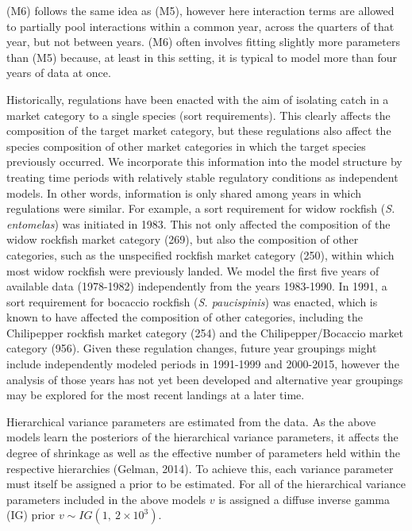 \documentclass[12pt]{article}
\begin{document}
(M6) follows the same idea as (M5), however here interaction terms are
allowed to partially pool interactions within a common year, across the
quarters of that year, but not between years. (M6) often involves
fitting slightly more parameters than (M5) because, at least in this
setting, it is typical to model more than four years of data at once.

Historically, regulations have been enacted with the aim of isolating
catch in a market category to a single species (sort requirements). This
clearly affects the composition of the target market category, but these
regulations also affect the species composition of other market
categories in which the target species previously occurred. We
incorporate this information into the model structure by treating time
periods with relatively stable regulatory conditions as independent
models. In other words, information is only shared among years in which
regulations were similar. For example, a sort requirement for widow
rockfish (\textit{S. entomelas}) was initiated in 1983. This not only affected
the composition of the widow rockfish market category (269), but also
the composition of other categories, such as the unspecified rockfish
market category (250), within which most widow rockfish were previously 
landed. We model the first five years of available data (1978-1982) 
independently from the years 1983-1990. In 1991, a sort requirement for 
bocaccio rockfish (\textit{S. paucispinis}) was enacted, which is known to 
have affected the composition of other categories, including the Chilipepper 
rockfish market category (254) and the Chilipepper/Bocaccio market category 
(956). Given these regulation changes, future year groupings might include 
independently modeled periods in 1991-1999 and 2000-2015, however the analysis 
of those years has not yet been developed and alternative year groupings may 
be explored for the most recent landings at a later time.
%

Hierarchical variance parameters are estimated from the data. As the
above models learn the posteriors of the hierarchical variance
parameters, it affects the degree of shrinkage as well as the effective
number of parameters held within the respective hierarchies (Gelman,
2014). To achieve this, each variance parameter must itself be assigned
a prior to be estimated. For all of the hierarchical variance parameters
included in the above models \(v\) is assigned a diffuse inverse gamma
(IG) prior \(v \sim IG(1,~2\times10^{3})\).
\end{document}
